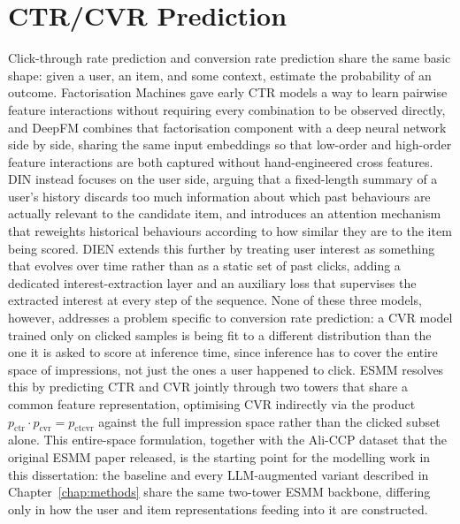 \documentclass{uclthesis}
\begin{document}
\section{CTR/CVR Prediction}
Click-through rate prediction and conversion rate prediction share the same basic shape: given a user, an item, and some context, estimate the probability of an outcome. Factorisation Machines gave early CTR models a way to learn pairwise feature interactions without requiring every combination to be observed directly, and DeepFM \citep{guo2017deepfm} combines that factorisation component with a deep neural network side by side, sharing the same input embeddings so that low-order and high-order feature interactions are both captured without hand-engineered cross features. DIN \citep{zhou2018din} instead focuses on the user side, arguing that a fixed-length summary of a user's history discards too much information about which past behaviours are actually relevant to the candidate item, and introduces an attention mechanism that reweights historical behaviours according to how similar they are to the item being scored. DIEN \citep{zhou2019dien} extends this further by treating user interest as something that evolves over time rather than as a static set of past clicks, adding a dedicated interest-extraction layer and an auxiliary loss that supervises the extracted interest at every step of the sequence.
None of these three models, however, addresses a problem specific to conversion rate prediction: a CVR model trained only on clicked samples is being fit to a different distribution than the one it is asked to score at inference time, since inference has to cover the entire space of impressions, not just the ones a user happened to click. ESMM \citep{ma2018esmm} resolves this by predicting CTR and CVR jointly through two towers that share a common feature representation, optimising CVR indirectly via the product $p_{\text{ctr}} \cdot p_{\text{cvr}} = p_{\text{ctcvr}}$ against the full impression space rather than the clicked subset alone. This entire-space formulation, together with the Ali-CCP dataset that the original ESMM paper released, is the starting point for the modelling work in this dissertation: the baseline and every LLM-augmented variant described in Chapter~\ref{chap:methods} share the same two-tower ESMM backbone, differing only in how the user and item representations feeding into it are constructed.
\end{document}

